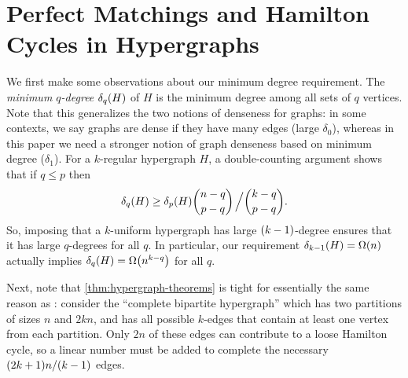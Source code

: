 \documentclass[11pt,english]{article}
\theoremstyle{plain}
\theoremstyle{definition}
\theoremstyle{definition}
\theoremstyle{plain}
\theoremstyle{plain}
\theoremstyle{plain}
\theoremstyle{plain}
\theoremstyle{remark}
\theoremstyle{remark}
\let\originalleft\left
\let\originalright\right
\renewcommand{\left}{\mathopen{}\mathclose\bgroup\originalleft}
\renewcommand{\right}{\aftergroup\egroup\originalright}
\begin{document}
\section{\label{sec:hypergraphs}Perfect Matchings and Hamilton Cycles in
Hypergraphs}

We first make some observations about our minimum degree requirement.
The \emph{minimum $q$-degree} $\delta_{q}\left(H\right)$ of $H$
is the minimum degree among all sets of $q$ vertices. Note that this
generalizes the two notions of denseness for graphs: in some contexts,
we say graphs are dense if they have many edges (large $\delta_{0}$),
whereas in this paper we need a stronger notion of graph denseness
based on minimum degree ($\delta_{1}$). For a $k$-regular hypergraph
$H$, a double-counting argument shows that if $q\le p$ then 
\[
\delta_{q}\left(H\right)\ge\delta_{p}\left(H\right){n-q \choose p-q}\left.\vphantom{\sum}\right/{k-q \choose p-q}.
\]
So, imposing that a $k$-uniform hypergraph has large $\left(k-1\right)$-degree
ensures that it has large $q$-degrees for all $q$. In particular,
our requirement $\delta_{k-1}\left(H\right)=\Omega\left(n\right)$
actually implies $\delta_{q}\left(H\right)=\Omega\left(n^{k-q}\right)$
for all $q$.

Next, note that \ref{thm:hypergraph-theorems} is tight for essentially
the same reason as \cite[Theorem~1]{BFM03}: consider the ``complete
bipartite hypergraph'' which has two partitions of sizes $n$ and
$2kn$, and has all possible $k$-edges that contain at least one
vertex from each partition. Only $2n$ of these edges can contribute
to a loose Hamilton cycle, so a linear number must be added to complete
the necessary $\left(2k+1\right)n/\left(k-1\right)$ edges.
\end{document}
